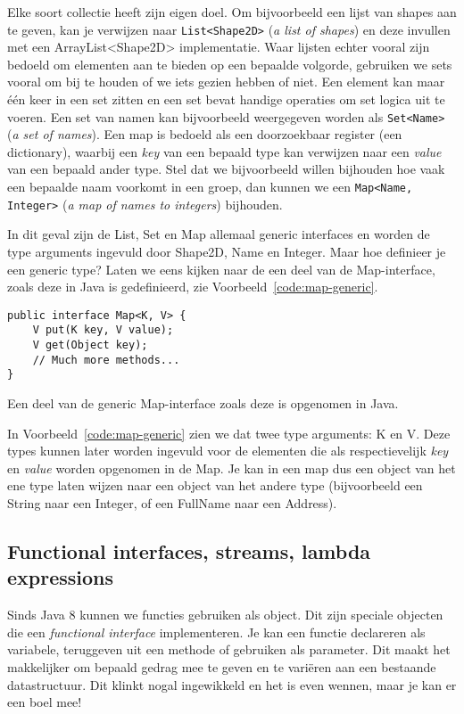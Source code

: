 \documentclass[dutch,a4paper,12pt,doubleside]{book}
\begin{document}
Elke soort collectie heeft zijn eigen doel. 
Om bijvoorbeeld een lijst van shapes aan te geven, 
kan je verwijzen naar \texttt{List<Shape2D>} (\textit{a list of shapes})
en deze invullen met een ArrayList<Shape2D> implementatie.
Waar lijsten echter vooral zijn bedoeld om elementen aan te bieden op een bepaalde volgorde,
gebruiken we sets vooral om bij te houden of we iets gezien hebben of niet. Een element 
kan maar één keer in een set zitten en een set bevat handige operaties om set logica 
uit te voeren. Een set van namen kan bijvoorbeeld weergegeven worden als 
\texttt{Set<Name>} (\textit{a set of names}).
Een map is bedoeld als een doorzoekbaar register (een dictionary),
waarbij een \textit{key} van een bepaald type kan verwijzen naar 
een \textit{value} van een bepaald ander type. Stel dat we bijvoorbeeld
willen bijhouden hoe vaak een bepaalde naam voorkomt in een groep,
dan kunnen we een \texttt{Map<Name, Integer>} (\textit{a map of names to integers})
bijhouden.

In dit geval zijn de List, Set en Map allemaal generic interfaces en
worden de type arguments ingevuld door Shape2D, Name en Integer.
Maar hoe definieer je een generic type? Laten we eens kijken naar de 
een deel van de Map-interface, zoals deze in Java is gedefinieerd,
zie Voorbeeld~\ref{code:map-generic}.

\begin{listing}[H]
\begin{verbatim}
public interface Map<K, V> {
    V put(K key, V value);
    V get(Object key);
    // Much more methods...
}
\end{verbatim}
\caption{Een deel van de generic Map-interface zoals deze is opgenomen in Java.}
\label{code:map-generic}
\end{listing}

In Voorbeeld~\ref{code:map-generic} zien we dat twee type arguments:
K en V. Deze types kunnen later worden ingevuld voor de elementen die 
als respectievelijk \textit{key} en \textit{value} worden opgenomen in de Map.
Je kan in een map dus een object van het ene type laten wijzen naar een 
object van het andere type 
(bijvoorbeeld een String naar een Integer, of een FullName naar een Address).

\subsection{Functional interfaces, streams, lambda expressions}
Sinds Java 8 kunnen we functies gebruiken als object. Dit zijn speciale objecten 
die een \textit{functional interface} implementeren. Je kan 
een functie declareren als variabele, teruggeven uit een methode of gebruiken 
als parameter. Dit maakt het makkelijker om bepaald gedrag mee te geven en 
te variëren aan een bestaande datastructuur. Dit klinkt nogal ingewikkeld en het 
is even wennen, maar je kan er een boel mee!
\end{document}
